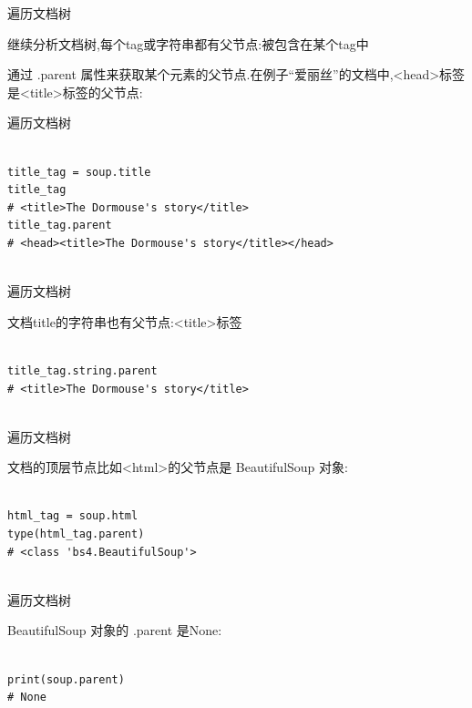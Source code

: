 \documentclass{beamer}
\begin{document}
\begin{frame}[t]{遍历文档树}

继续分析文档树,每个tag或字符串都有父节点:被包含在某个tag中

通过 .parent 属性来获取某个元素的父节点.在例子“爱丽丝”的文档中,<head>标签是<title>标签的父节点:
\end{frame}

\begin{frame}[t,fragile]{遍历文档树}
\begin{verbatim}

title_tag = soup.title
title_tag
# <title>The Dormouse's story</title>
title_tag.parent
# <head><title>The Dormouse's story</title></head>


\end{verbatim}


\end{frame}



\begin{frame}[t,fragile]{遍历文档树}

文档title的字符串也有父节点:<title>标签

\begin{verbatim}

title_tag.string.parent
# <title>The Dormouse's story</title>


\end{verbatim}
\end{frame}

\begin{frame}[t,fragile]{遍历文档树}

文档的顶层节点比如<html>的父节点是 BeautifulSoup 对象:

\begin{verbatim}

html_tag = soup.html
type(html_tag.parent)
# <class 'bs4.BeautifulSoup'>


\end{verbatim}


\end{frame}

\begin{frame}[t,fragile]{遍历文档树}

BeautifulSoup 对象的 .parent 是None:

\begin{verbatim}

print(soup.parent)
# None


\end{verbatim}


\end{frame}
\end{document}
